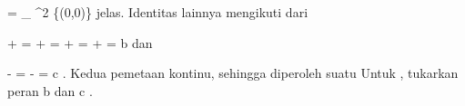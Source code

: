 \mavergleichskettedisp
{\vergleichskette
{ \varphi \circ \psi
}
{ =} {
_{ \R^2 \setminus \{(0,0)\}  }
}
{ } {
}
{ } {
}
{ } {
}
}
{}{}{}
jelas. Identitas lainnya mengikuti dari

\mavergleichskettealign
{\vergleichskettealign
{ {  } + 
}
{ =} { {  } + {  }  
}
{ =} { {  } + {  }  
}
{ =} { {  } + {  }
}
{ =} {b
}
}
{}
{}{}
dan

\mavergleichskettedisp
{\vergleichskette
{ {  } - 
}
{ =} { {  } - {  }
}
{ =} { c
}
{ } {}
{ } {}
}
{}{}{.}
Kedua pemetaan kontinu, sehingga diperoleh suatu
Untuk
, tukarkan peran
\mathkor {} {b} {dan} {c} {.}
